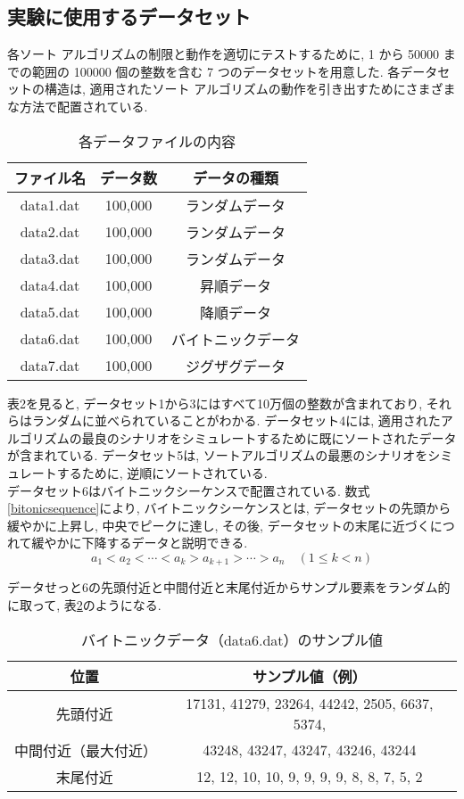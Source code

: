 \documentclass[a4j, 11pt]{jarticle}
\begin{document}
\subsection{実験に使用するデータセット}
各ソート アルゴリズムの制限と動作を適切にテストするために, 1 から 50000 までの範囲の 100000 個の整数を含む 7 つのデータセットを用意した. 各データセットの構造は, 適用されたソート アルゴリズムの動作を引き出すためにさまざまな方法で配置されている. 
\begin{table}[htbp]
  \centering
  \caption{各データファイルの内容}
  \begin{tabular}{|c|c|c|}
    \hline
    ファイル名 & データ数 & データの種類 \\
    \hline
    data1.dat & 100,000 & ランダムデータ \\
    data2.dat & 100,000 & ランダムデータ \\
    data3.dat & 100,000 & ランダムデータ \\
    data4.dat & 100,000 & 昇順データ \\
    data5.dat & 100,000 & 降順データ \\
    data6.dat & 100,000 & バイトニックデータ \\
    data7.dat & 100,000 & ジグザグデータ \\
    \hline
  \end{tabular}\label{tab:dataset-summary}
\end{table}
表2を見ると, データセット1から3にはすべて10万個の整数が含まれており, それらはランダムに並べられていることがわかる. データセット4には, 適用されたアルゴリズムの最良のシナリオをシミュレートするために既にソートされたデータが含まれている. データセット5は, ソートアルゴリズムの最悪のシナリオをシミュレートするために, 逆順にソートされている. \\

データセット6はバイトニックシーケンスで配置されている. 数式\ref{bitonicsequence}により, バイトニックシーケンスとは, データセットの先頭から緩やかに上昇し, 中央でピークに達し, その後, データセットの末尾に近づくにつれて緩やかに下降するデータと説明できる. \\
\begin{equation}\label{bitonicsequence}
a_1 < a_2 < \cdots < a_k > a_{k+1} > \cdots > a_n
\quad (1 \leq k < n)
\end{equation}

データせっと6の先頭付近と中間付近と末尾付近からサンプル要素をランダム的に取って, 表\ref{tab:data6-sample}のようになる. 
\begin{table}[H]
  \centering
  \caption{バイトニックデータ（data6.dat）のサンプル値}
  \begin{tabular}{|c|c|}
    \hline
    位置 & サンプル値（例） \\
    \hline
    先頭付近 & 17131, 41279, 23264, 44242, 2505, 6637, 5374,\\
    中間付近（最大付近） & 43248, 43247, 43247, 43246, 43244 \\
    末尾付近 & 12, 12, 10, 10, 9, 9, 9, 9, 8, 8, 7, 5, 2 \\
    \hline
  \end{tabular}\label{tab:data6-sample}
\end{table}
\end{document}
